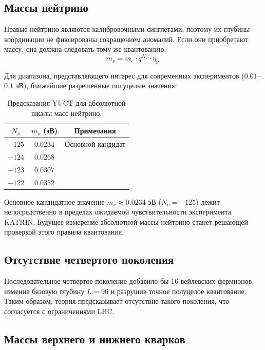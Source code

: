 \documentclass[12pt,a4paper]{article}
\begin{document}
	\subsection{Массы нейтрино}
	
	Правые нейтрино являются калибровочными синглетами, поэтому их глубины координации не фиксированы сокращением аномалий. Если они приобретают массу, она должна следовать тому же квантованию:
	\begin{equation}
		m_\nu = m_e \cdot q^{N_\nu} \cdot \eta_\nu.
	\end{equation}
	
	Для диапазона, представляющего интерес для современных экспериментов ($0.01$--$0.1$ эВ), ближайшие разрешенные полуцелые значения:
	
	\begin{table}[htbp]
		\centering
		\caption{Предсказания YUCT для абсолютной шкалы масс нейтрино.}
		\label{tab:neutrino}
		\begin{tabular}{c c c}
			\toprule
			$N_\nu$ & $m_\nu$ (эВ) & Примечания \\
			\midrule
			$-125$ & $0.0234$ & Основной кандидат \\
			$-124$ & $0.0268$ & \\
			$-123$ & $0.0307$ & \\
			$-122$ & $0.0352$ & \\
			\bottomrule
		\end{tabular}
	\end{table}
	
	Основное кандидатное значение $m_\nu \approx 0.0234$ эВ ($N_\nu = -125$) лежит непосредственно в пределах ожидаемой чувствительности эксперимента KATRIN. Будущее измерение абсолютной массы нейтрино станет решающей проверкой этого правила квантования.
	
	
	
	\subsection{Отсутствие четвертого поколения}
	
	Последовательное четвертое поколение добавило бы 16 вейлевских фермионов, изменив базовую глубину $L=96$ и разрушив точное полуцелое квантование. Таким образом, теория предсказывает отсутствие такого поколения, что согласуется с ограничениями LHC.
	
	\subsection{Массы верхнего и нижнего кварков}
	
\end{document}
